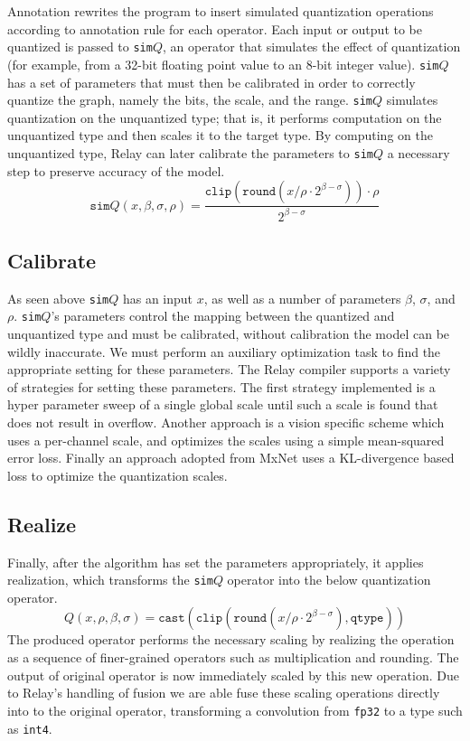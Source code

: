 Annotation rewrites the program to insert simulated quantization operations
  according to annotation rule for each operator.
Each input or output to be quantized is passed to \texttt{sim$Q$},
  an operator that simulates the effect of quantization (for example, from a 32-bit
  floating point value to an 8-bit integer value).
\texttt{sim$Q$} has a set of parameters that must then be calibrated in order to
  correctly quantize the graph, namely the bits, the scale, and the range.
\texttt{sim$Q$} simulates quantization on
  the unquantized type; that is, it performs computation on the unquantized type
  and then scales it to the target type.
By computing on the unquantized type, Relay can later calibrate the parameters to
  \texttt{sim$Q$} a necessary step to preserve accuracy of the model.
\[
  \texttt{sim$Q$}\left(x, \beta, \sigma, \rho\right) = \dfrac{\texttt{clip}\left(\texttt{round}\left(x / \rho \cdot 2^{\beta - \sigma}\right)\right) \cdot \rho}{2^{\beta - \sigma}}
\]
\subsection*{Calibrate}
As seen above \texttt{sim$Q$} has an input $x$, as well as a number of parameters
  $\beta$, $\sigma$, and $\rho$.
\texttt{sim$Q$}'s parameters control the mapping between the quantized and unquantized type
  and must be calibrated, without calibration the model can be wildly inaccurate.
We must perform an auxiliary optimization task to find the appropriate
  setting for these parameters.
The Relay compiler supports a variety of strategies for setting these
  parameters.
The first strategy implemented is a hyper parameter sweep of a
  single global scale until such a scale is found that does not result
  in overflow.
Another approach is a vision specific scheme which uses
  a per-channel scale, and optimizes the scales using a
  simple mean-squared error loss.
Finally an approach adopted from MxNet uses a
  KL-divergence based loss to optimize the
  quantization scales.

\subsection*{Realize}

Finally, after the algorithm has set the parameters appropriately,
  it applies realization,
  which transforms the \texttt{sim$Q$} operator into the below
  quantization operator.
\[
  Q\left(x, \rho, \beta, \sigma\right) = \texttt{cast}\left(\texttt{clip}\left(\texttt{round}\left(x / \rho \cdot 2^{\beta-\sigma}\right), \texttt{qtype}\right)\right)
\]
The produced operator performs the necessary scaling
  by realizing the operation as a sequence of finer-grained
  operators such as multiplication and rounding.
The output of original operator is now immediately scaled
  by this new operation.
Due to Relay's handling of fusion
  we are able fuse these scaling operations directly into
  to the original operator, transforming a convolution
  from \verb|fp32| to a type such as \verb|int4|.

